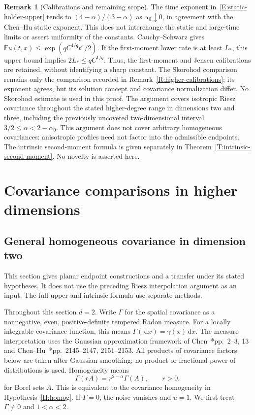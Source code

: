 \documentclass[12pt,oneside,openany]{book}
\numberwithin{equation}{section}
\theoremstyle{nogostyle}
\theoremstyle{definition}
\newtheorem{remark}[theorem]{Remark}
\newcommand{\E}{\mathbb{E}}
\newcommand{\ud}{\,\mathrm{d}}
\begin{document}
\begin{remark}[Calibrations and remaining scope]\label{R:static-holder-scope}
  The time exponent in~\eqref{E:static-holder-upper} tends to
  $(4-\alpha)/(3-\alpha)$ as $\alpha_0\downarrow0$, in agreement with the
  Chen--Hu static exponent. This does not interchange the static and large-time
  limits or assert uniformity of the constants. Cauchy--Schwarz gives $\E u(t,x)
  \le \exp(qC^{1/q}t^\kappa/2)$. If the first-moment lower rate is at least
  $L_*$, this upper bound implies $2L_* \le qC^{1/q}$. Thus, the first-moment
  and Jensen calibrations are retained, without identifying a sharp constant.
  The Skorohod comparison remains only the comparison recorded in
  Remark~\ref{R:higher-calibrations}; its exponent agrees, but its solution
  concept and covariance normalization differ. No Skorohod estimate is used in
  this proof. The argument covers isotropic Riesz covariance throughout the
  stated higher-degree range in dimensions two and three, including the
  previously uncovered two-dimensional interval $3/2 \le \alpha < 2-\alpha_0$.
  This argument does not cover arbitrary homogeneous covariances: anisotropic
  profiles need not factor into the admissible endpoints. The intrinsic
  second-moment formula is given separately in
  Theorem~\ref{T:intrinsic-second-moment}. No novelty is asserted here.
\end{remark}


\chapter{Covariance comparisons in higher dimensions}\label{S:appendix-covariance}



\section{General homogeneous covariance in dimension two}
\label{S:planar-holder}

This section gives planar endpoint constructions and a transfer under its stated
hypotheses. It does not use the preceding Riesz interpolation argument as an
input. The full upper and intrinsic formula use separate methods.

Throughout this section $d = 2$. Write $\Gamma$ for the spatial covariance as a
nonnegative, even, positive-definite tempered Radon measure. For a locally
integrable covariance function, this means $\Gamma(\ud x) = \gamma(x)\ud x$. The
measure interpretation uses the Gaussian approximation framework of
Chen~\cite{chen:author2026:time-dependency}*{pp.~2--3, 13} and
Chen--Hu~\cite{chen.hu:25:hyperbolic}*{pp.~2145--2147, 2151--2153}. All products
of covariance factors below are taken after Gaussian smoothing; no product or
fractional power of distributions is used. Homogeneity means
\begin{equation}\label{E:planar-measure-scaling}
  \Gamma(rA)=r^{2-\alpha}\Gamma(A),\qquad r>0,
\end{equation}
for Borel sets $A$. This is equivalent to the covariance homogeneity in
Hypothesis~\ref{H:homog}. If $\Gamma = 0$, the noise vanishes and $u = 1$. We
first treat $\Gamma \ne 0$ and $1 < \alpha < 2$.
\end{document}

